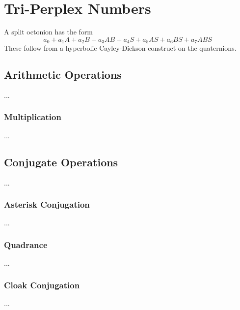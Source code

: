 \chapter{Tri-Perplex Numbers}
A split octonion has the form
\begin{equation}
    a_{0} + a_{1} A + a_{2} B + a_{3} AB + a_{4} S + a_{5} AS + a_{6} BS + a_{7} ABS
\end{equation}
These follow from a hyperbolic Cayley-Dickson construct on the quaternions.
\section{Arithmetic Operations}
...
\subsection{Multiplication}
...
\section{Conjugate Operations}
...
\subsection{Asterisk Conjugation}
...
\subsection{Quadrance}
...
\subsection{Cloak Conjugation}
...
